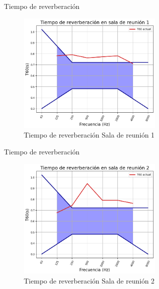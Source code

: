 \documentclass{sintefbeamer}
\begin{document}
\begin{frame}{Tiempo de reverberación}
    \begin{figure}
        \centering
        \includegraphics[width=7cm]{images/DIN/DIN sala reunion 1 actual.png}
        \caption{Tiempo de reverberación Sala de reunión 1}
        \label{fig:Ttarget sala de reunion 1}
    \end{figure}
\end{frame}
\begin{frame}{Tiempo de reverberación}
    \begin{figure}
        \centering
        \includegraphics[width=7cm]{images/DIN/DIN sala reunion 2 actual.png}
        \caption{Tiempo de reverberación Sala de reunión 2}
        \label{fig:Ttarget sala de reunion 2}
    \end{figure}
\end{frame}
\end{document}
